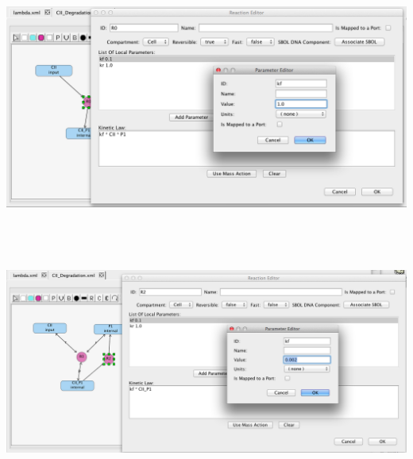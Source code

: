 \documentclass[titlepage,11pt]{article}
\begin{document}
\begin{center}
\includegraphics[height=80mm]{screenshots/localParam}
\end{center}

\begin{center}
\includegraphics[height=80mm]{screenshots/kineticLaw} 
\end{center}
\end{document}
